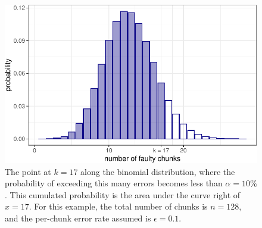 \documentclass[manuscript,screen,review]{acmart}
\begin{document}
\begin{figure}[!ht]
  \centering
  \includegraphics[width=.7\textwidth]{figs/fig-alpha-1.pdf}
  \caption{The point at $k=17$ along the binomial distribution, where the probability of exceeding this many errors becomes less than $\alpha = 10\%$. This cumulated probability is the area under the curve right of $x=17$. For this example, the total number of chunks is $n = 128$, and the per-chunk error rate assumed is $\epsilon = 0.1$.}
  \label{fig:alpha}
\end{figure}
\end{document}
